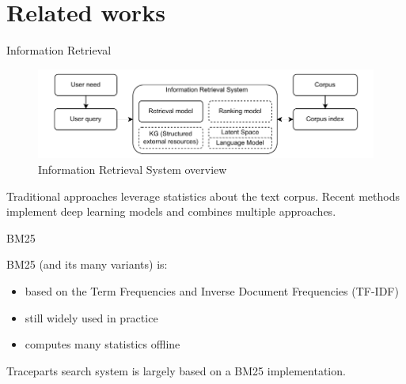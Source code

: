 \section{Related works}

\begin{frame}{Information Retrieval}
    
    \begin{figure} [H]
        \begin{center}
            \includegraphics[scale=0.8]{images/ir-system-comps.pdf} 
            \caption{Information Retrieval System overview} 
        \end{center}
    \end{figure}

    \begin{center}
        Traditional approaches leverage statistics about the text corpus. Recent methods implement deep learning models and combines multiple approaches.
    \end{center}
    
\end{frame}

\begin{frame}{BM25}
    
    BM25 (and its many variants) is:
    \begin{itemize}
        \item based on the Term Frequencies and Inverse Document Frequencies (TF-IDF)
        \item still widely used in practice
        \item computes many statistics offline
    \end{itemize}

    \begin{center}
        Traceparts search system is largely based on a BM25 implementation.
    \end{center}
    
\end{frame}

